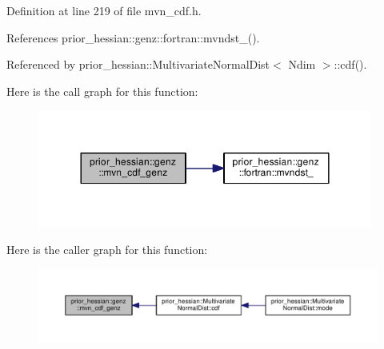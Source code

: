 Definition at line 219 of file mvn\+\_\+cdf.\+h.



References prior\+\_\+hessian\+::genz\+::fortran\+::mvndst\+\_\+().



Referenced by prior\+\_\+hessian\+::\+Multivariate\+Normal\+Dist$<$ Ndim $>$\+::cdf().



Here is the call graph for this function\+:\nopagebreak
\begin{figure}[H]
\begin{center}
\leavevmode
\includegraphics[width=312pt]{namespaceprior__hessian_1_1genz_a5462d1271384fa7431ee84709c0f8a88_cgraph}
\end{center}
\end{figure}




Here is the caller graph for this function\+:\nopagebreak
\begin{figure}[H]
\begin{center}
\leavevmode
\includegraphics[width=350pt]{namespaceprior__hessian_1_1genz_a5462d1271384fa7431ee84709c0f8a88_icgraph}
\end{center}
\end{figure}


